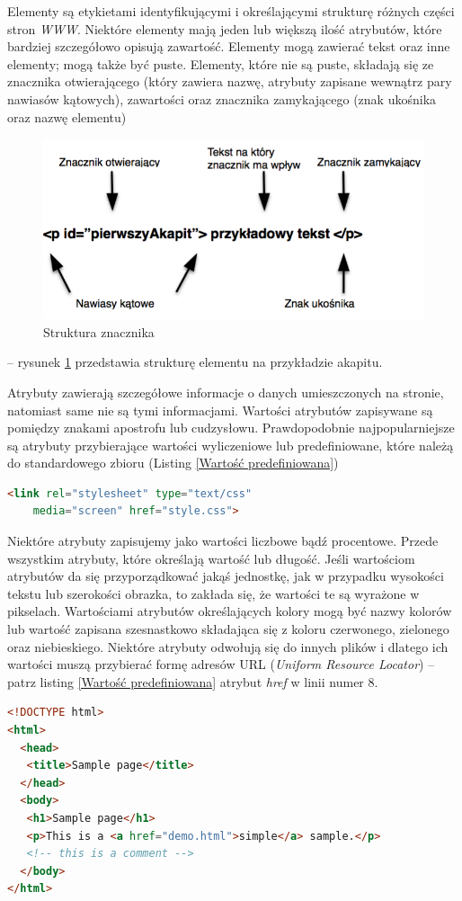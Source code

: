 \documentclass{iiuwb}
\begin{document}
Elementy są etykietami identyfikującymi i określającymi strukturę różnych części stron \textit{WWW}. Niektóre elementy mają jeden lub większą ilość atrybutów, które bardziej szczegółowo opisują zawartość. Elementy mogą zawierać tekst oraz inne elementy; mogą także być puste. Elementy, które nie są puste, składają się ze znacznika otwierającego (który zawiera nazwę, atrybuty zapisane wewnątrz pary nawiasów kątowych), zawartości oraz znacznika zamykającego (znak ukośnika oraz nazwę elementu) \cite{Castro:2008:H} 
\begin{figure}[!th]
\centering
\includegraphics[scale=.5]{image/StrukturaZnacznika2.png}
\caption{Struktura znacznika}
\label{fig:Struktura znacznika}
\end{figure}
-- rysunek \ref{fig:Struktura znacznika} przedstawia strukturę elementu na przykładzie akapitu.

Atrybuty zawierają szczegółowe informacje o danych umieszczonych na stronie, natomiast same nie są tymi informacjami. Wartości atrybutów zapisywane są pomiędzy znakami apostrofu lub cudzysłowu. Prawdopodobnie najpopularniejsze są atrybuty przybierające wartości wyliczeniowe lub predefiniowane, które należą do standardowego zbioru (Listing \ref{Wartość predefiniowana})
\begin{lstlisting}[language=HTML, label=Wartość predefiniowana, caption=Wartość predefiniowana]
<link rel="stylesheet" type="text/css" 
	media="screen" href="style.css">
\end{lstlisting}
Niektóre atrybuty zapisujemy jako wartości liczbowe bądź procentowe. Przede wszystkim atrybuty, które określają wartość lub długość. Jeśli wartościom atrybutów da  się przyporządkować jakąś jednostkę, jak w przypadku wysokości tekstu lub szerokości obrazka, to zakłada się, że wartości te są wyrażone w pikselach.
Wartościami atrybutów określających kolory mogą być nazwy kolorów lub wartość zapisana szesnastkowo składająca się z koloru czerwonego, zielonego oraz niebieskiego.
Niektóre atrybuty odwołują się do innych plików i dlatego ich wartości muszą przybierać formę adresów URL (\textit{Uniform Resource Locator}) -- patrz listing \ref{Wartość predefiniowana} atrybut \textit{href} w linii numer 8.
	\begin{lstlisting}[language=HTML, label=Przykladowy HTML,  caption=Przykładowa składnia dokumentu HTML]
<!DOCTYPE html>
<html>
  <head>
   <title>Sample page</title>
  </head>
  <body>
   <h1>Sample page</h1>
   <p>This is a <a href="demo.html">simple</a> sample.</p>
   <!-- this is a comment -->
  </body>
</html>
	\end{lstlisting}
	
\end{document}
